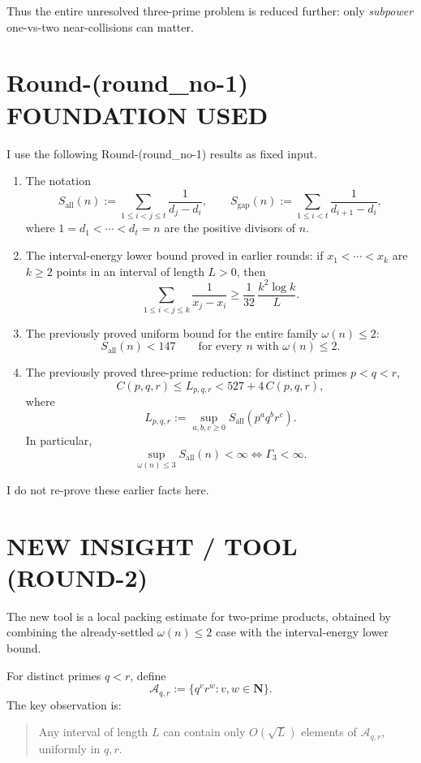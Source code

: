 Thus the entire unresolved three-prime problem is reduced further: only \emph{subpower} one-vs-two near-collisions can matter.

\section{Round-(round\_no-1) FOUNDATION USED}

I use the following Round-(round\_no-1) results as fixed input.

\begin{enumerate}
\item The notation
\[
S_{\mathrm{all}}(n):=\sum_{1\le i<j\le t}\frac{1}{d_j-d_i},
\qquad
S_{\mathrm{gap}}(n):=\sum_{1\le i<t}\frac{1}{d_{i+1}-d_i},
\]
where \(1=d_1<\cdots<d_t=n\) are the positive divisors of \(n\).

\item The interval-energy lower bound proved in earlier rounds: if \(x_1<\cdots<x_k\) are \(k\ge 2\) points in an interval of length \(L>0\), then
\[
\sum_{1\le i<j\le k}\frac{1}{x_j-x_i}\ge \frac{1}{32}\,\frac{k^2\log k}{L}.
\tag{F1}
\]

\item The previously proved uniform bound for the entire family \(\omega(n)\le 2\):
\[
S_{\mathrm{all}}(n)<147
\qquad\text{for every }n\text{ with }\omega(n)\le 2.
\tag{F2}
\]

\item The previously proved three-prime reduction: for distinct primes \(p<q<r\),
\[
C(p,q,r)\le L_{p,q,r}<527+4\,C(p,q,r),
\tag{F3}
\]
where
\[
L_{p,q,r}:=\sup_{a,b,c\ge 0}S_{\mathrm{all}}(p^a q^b r^c).
\]
In particular,
\[
\sup_{\omega(n)\le 3} S_{\mathrm{all}}(n)<\infty
\iff
\Gamma_3<\infty.
\tag{F4}
\]
\end{enumerate}

I do not re-prove these earlier facts here.

\section{NEW INSIGHT / TOOL (ROUND-2)}

The new tool is a local packing estimate for two-prime products, obtained by combining the already-settled \(\omega(n)\le 2\) case with the interval-energy lower bound.

For distinct primes \(q<r\), define
\[
\mathcal A_{q,r}:=\{q^v r^w : v,w\in \mathbf N\}.
\]
The key observation is:

\begin{quote}
Any interval of length \(L\) can contain only \(O(\sqrt L)\) elements of \(\mathcal A_{q,r}\), uniformly in \(q,r\).
\end{quote}

